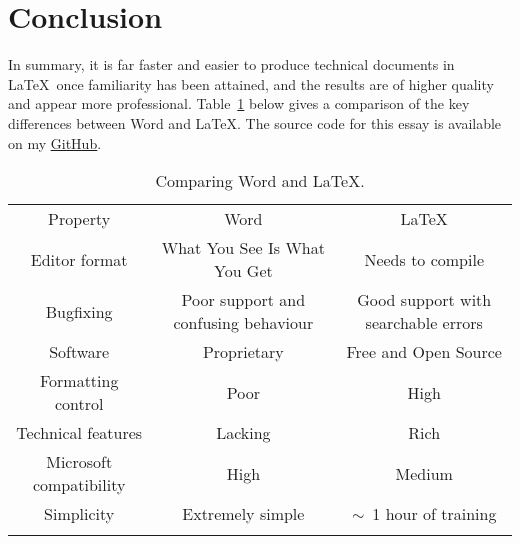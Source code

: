 \section{Conclusion}
\label{sec:Conclusion}

In summary, it is far faster and easier to produce technical documents in \LaTeX\ once familiarity has been attained, and the results are of higher quality and appear more professional. Table~\ref{tab:Comparison} below gives a comparison of the key differences between Word and \LaTeX. The source code for this essay is available on my \href{https://github.com/HenryGinn/Essays/tree/main/TheCaseForLaTeX}{\underline{GitHub}}.

\begin{table}[H]
	\centering
	\caption{Comparing Word and \LaTeX.}
	\label{tab:Comparison}
	\begin{tabular}{ccc}
		\myhline
		Property & Word & \LaTeX  \\
		\myhline
		Editor format & What You See Is What You Get & Needs to compile  \\
		Bugfixing & Poor support and confusing behaviour & Good support with searchable errors  \\
		Software & Proprietary & Free and Open Source  \\
		Formatting control & Poor & High  \\
		Technical features & Lacking & Rich  \\
		Microsoft compatibility & High & Medium  \\
		Simplicity & Extremely simple &  $\sim$~1 hour of training  \\
		\myhline
	\end{tabular}
\end{table}